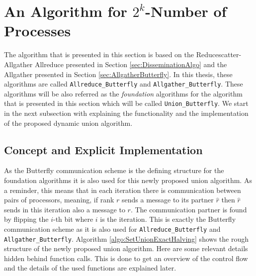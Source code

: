 \section{An Algorithm for $2^k$-Number of Processes} \label{sec:UnionButterfly}
The algorithm that is presented in this section is based on the Reducescatter-Allgather Allreduce presented in Section \ref{sec:DisseminationAlgo} and the Allgather presented in Section \ref{sec:AllgatherButterfly}. In this thesis, these algorithms are called \texttt{All\-re\-duce\_But\-ter\-fly} and \texttt{All\-gath\-er\_But\-ter\-fly}. These algorithms will be also referred as the \emph{foundation} algorithms for the algorithm that is presented in this section which will be called \texttt{Union\_Butterfly}. We start in the next subsection with explaining the functionality and the implementation of the proposed dynamic union algorithm.

\subsection{Concept and Explicit Implementation}
As the Butterfly communication scheme is the defining structure for the foundation algorithms it is also used for this newly proposed union algorithm. As a reminder, this means that in each iteration there is communication between pairs of processors, meaning, if rank $r$ sends a message to its partner $\hat{r}$ then $\hat{r}$ sends in this iteration also a message to $r$. The communication partner is found by flipping the $i$-th bit where $i$ is the iteration. This is exactly the Butterfly communication scheme as it is also used for \texttt{All\-re\-duce\_But\-ter\-fly} and \texttt{All\-gath\-er\_But\-ter\-fly}. Algorithm \ref{algo:SetUnionExactHalving} shows the rough structure of the newly proposed union algorithm. Here are some relevant details hidden behind function calls. This is done to get an overview of the control flow and the details of the used functions are explained later. 


